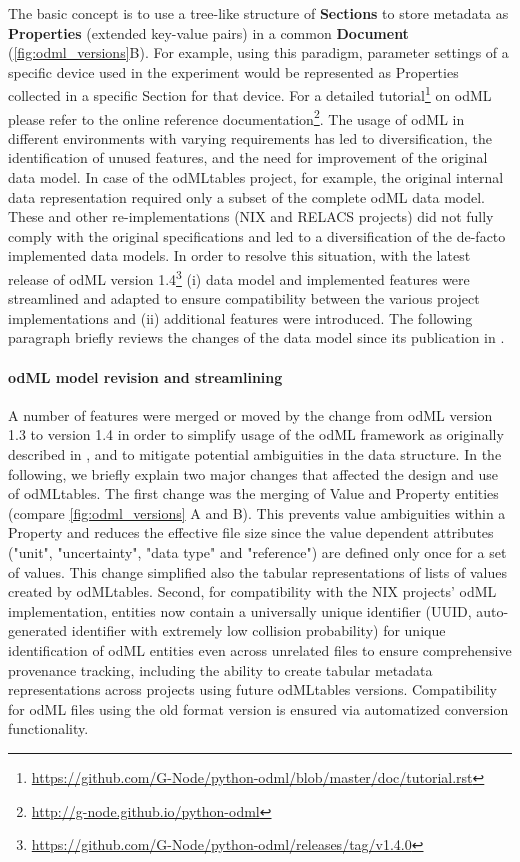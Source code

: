 The basic concept is to use a tree-like structure of \textbf{Sections} to store metadata as \textbf{Properties} (extended key-value pairs) in a common \textbf{Document} (\cref{fig:odml_versions}B). For example, using this paradigm,  parameter settings of a specific device used in the experiment would be represented as Properties collected in a specific Section for that device. For a detailed tutorial\footnote{\url{https://github.com/G-Node/python-odml/blob/master/doc/tutorial.rst}} on odML please refer to the online reference documentation\footnote{\url{http://g-node.github.io/python-odml}}. The usage of odML in different environments with varying requirements has led to diversification, the identification of unused features, and the need for improvement of the original data model. In case of the odMLtables project, for example, the original internal data representation required only a subset of the complete odML data model. These and other re-implementations (NIX and RELACS projects) did not fully comply with the original specifications and led to a diversification of the de-facto implemented data models. In order to resolve this situation, with the latest release of odML version 1.4\footnote{\url{https://github.com/G-Node/python-odml/releases/tag/v1.4.0}} (i) data model and implemented features were streamlined and adapted to ensure compatibility between the various project implementations and (ii) additional features were introduced. The following paragraph briefly reviews the changes of the data model since its publication in \cite{Grewe_2011}.

\paragraph{odML model revision and streamlining}
A number of features were merged or moved by the change from odML version 1.3 to version 1.4 in order to simplify usage of the odML framework as originally described in \citet{Grewe_2011}, and to mitigate potential ambiguities in the data structure. In the following, we briefly explain two major changes that affected the design and use of odMLtables. The first change was the merging of Value and Property entities (compare \cref{fig:odml_versions} A and B). This prevents value ambiguities within a Property and reduces the effective file size since the value dependent attributes ("unit", "uncertainty", "data type" and "reference") are defined only once for a set of values. This change simplified also the tabular representations of lists of values created by odMLtables. Second, for compatibility with the NIX projects' odML implementation, entities now contain a universally unique identifier (UUID, auto-generated identifier with extremely low collision probability) for unique identification of odML entities even across unrelated files to ensure comprehensive provenance tracking, including the ability to create tabular metadata representations across projects using future odMLtables versions. Compatibility for odML files using the old format version is ensured via automatized conversion functionality.

